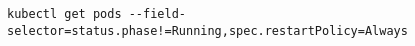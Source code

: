 \begin{verbatim}
kubectl get pods --field-selector=status.phase!=Running,spec.restartPolicy=Always
\end{verbatim}